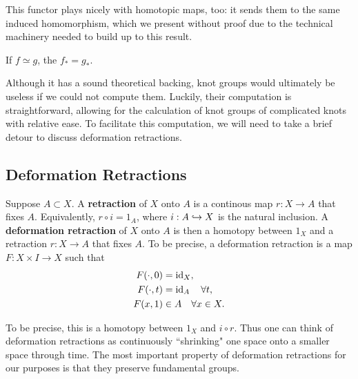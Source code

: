 \documentclass[twoside,10pt]{article}
\begin{document}
This functor plays nicely with homotopic maps, too: it sends them to the same induced homomorphism, which we present without proof due to the technical machinery needed to build up to this result.

\begin{prop}
	\label{homotopic-same-induced}
If $f \simeq g$, the $f_* = g_*$.
\end{prop}

Although it has a sound theoretical backing, knot groups would ultimately be useless if we could not compute them. Luckily, their computation is straightforward, allowing for the calculation of knot groups of complicated knots with relative ease. To facilitate this computation, we will need to take a brief detour to discuss deformation retractions.

\subsection{Deformation Retractions}

Suppose $A \subset X$. A \textbf{retraction} of $X$ onto $A$ is a continous map $r:X\to A$ that fixes $A$. Equivalently, $r \circ i = 1_{A}$, where $i:A \hookrightarrow X$ is the natural inclusion. A \textbf{deformation retraction} of $X$ onto $A$ is then a homotopy between $1_X$ and a retraction $r:X\to A$ that fixes $A$. To be precise, a deformation retraction is a map $F:X\times I \to X$ such that
\begin{align*}
	F(\cdot,0) &= \operatorname{id}_{X}, \\
	F(\cdot,t) &= \operatorname{id}_{A} \quad \forall t, \\
	F(x,1) &\in A \quad \forall x \in X.
\end{align*}

To be precise, this is a homotopy between $1_X$ and $i \circ r$. Thus one can think of deformation retractions as continuously ``shrinking" one space onto a smaller space through time. The most important property of deformation retractions for our purposes is that they preserve fundamental groups.
\end{document}
